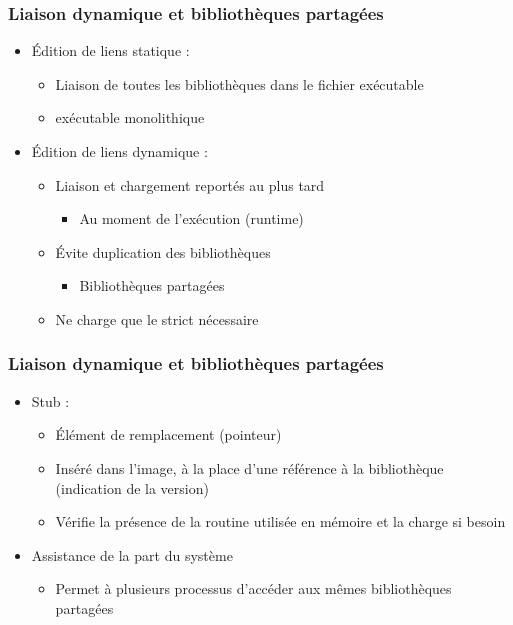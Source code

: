 \begin{frame}
\frametitle{Liaison dynamique et bibliothèques partagées}
\begin{itemize}
\item Édition de liens statique :
\begin{itemize}
\item Liaison de toutes les bibliothèques dans le fichier exécutable
\item exécutable monolithique
\end{itemize}
\item Édition de liens dynamique :
\begin{itemize}
\item Liaison et chargement reportés au plus tard
\begin{itemize}
\item Au moment de l'exécution (runtime)
\end{itemize}
\item Évite duplication des bibliothèques
\begin{itemize}
\item Bibliothèques partagées
\end{itemize}
\item Ne charge que le strict nécessaire
\end{itemize}
\end{itemize}
\end{frame}


\begin{frame}
\frametitle{Liaison dynamique et bibliothèques partagées}
\begin{itemize}
\item Stub :
\begin{itemize}
\item Élément de remplacement (pointeur)
\item Inséré dans l'image, à la place d'une référence à la bibliothèque (indication de la version)
\item Vérifie la présence de la routine utilisée en mémoire et la charge si besoin
\end{itemize}
\item Assistance de la part du système
\begin{itemize}
\item Permet à plusieurs processus d'accéder aux mêmes bibliothèques partagées
\end{itemize}
\end{itemize}
\end{frame}

